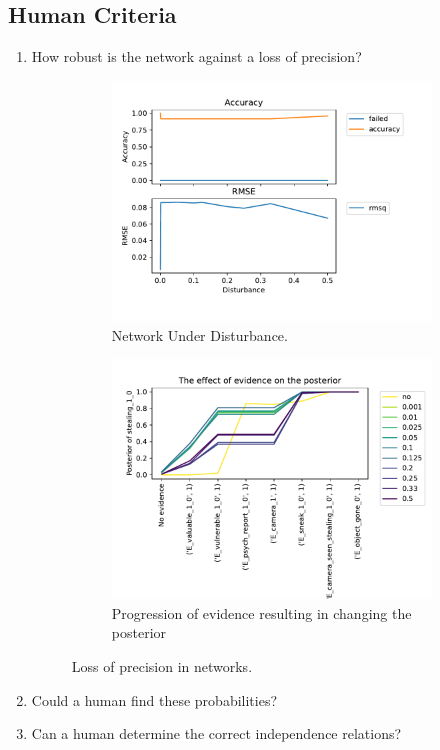 \subsection{Human Criteria}
\begin{enumerate}
\item How robust is the network against a loss of precision?

\begin{figure}[htbp]
\begin{center}
\begin{subfigure}{.5\textwidth}
\includegraphics[width=0.9\linewidth]{../experiments/GroteMarkt/plots/performance_GroteMarkt.pdf}
\caption{Network Under Disturbance.}
\label{dist}
\end{subfigure}%
\begin{subfigure}{.5\textwidth}
\includegraphics[width=0.9\linewidth]{../experiments/GroteMarkt/plots/posterior_GroteMarkt.pdf}
\caption{ Progression of evidence resulting in changing the posterior}
\label{post}
\end{subfigure}
\end{center}
\caption{Loss of precision in networks.}
\end{figure}

\item Could a human find these probabilities?
\item Can a human determine the correct independence relations?
\end{enumerate}

